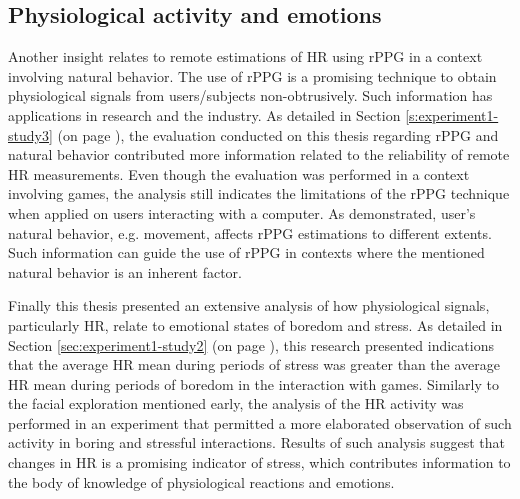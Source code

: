 \subsection{Physiological activity and emotions}

Another insight relates to remote estimations of HR using rPPG in a context involving natural behavior. The use of rPPG is a promising technique to obtain physiological signals from users/subjects non-obtrusively. Such information has applications in research and the industry. As detailed in Section \ref{s:experiment1-study3} (on page \pageref{s:experiment1-study3}), the evaluation conducted on this thesis regarding rPPG and natural behavior contributed more information related to the reliability of remote HR measurements. Even though the evaluation was performed in a context involving games, the analysis still indicates the limitations of the rPPG technique when applied on users interacting with a computer. As demonstrated, user's natural behavior, e.g. movement, affects rPPG estimations to different extents. Such information can guide the use of rPPG in contexts where the mentioned natural behavior is an inherent factor.

Finally this thesis presented an extensive analysis of how physiological signals, particularly HR, relate to emotional states of boredom and stress. As detailed in Section \ref{sec:experiment1-study2} (on page \pageref{sec:experiment1-study2}), this research presented indications that the average HR mean during periods of stress was greater than the average HR mean during periods of boredom in the interaction with games. Similarly to the facial exploration mentioned early, the analysis of the HR activity was performed in an experiment that permitted a more elaborated observation of such activity in boring and stressful interactions. Results of such analysis suggest that changes in HR is a promising indicator of stress, which contributes information to the body of knowledge of physiological reactions and emotions.



